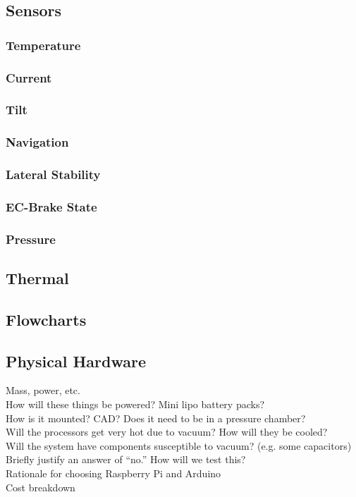 \documentclass[main.tex]{subfiles}
\begin{document}
    \subsection{Sensors}
    \subsubsection{Temperature}
    \subsubsection{Current}
    \subsubsection{Tilt}
    \subsubsection{Navigation}
    \subsubsection{Lateral Stability}
    \subsubsection{EC-Brake State}
    \subsubsection{Pressure}

    \subsection{Thermal}
    \subsection{Flowcharts}

    \subsection{Physical Hardware}
    Mass, power, etc.\\
    How will these things be powered? Mini lipo battery packs?\\
    How is it mounted? CAD? Does it need to be in a pressure chamber?\\
    Will the processors get very hot due to vacuum? How will they be cooled?\\
    Will the system have components susceptible to vacuum? (e.g. some capacitors) Briefly justify an answer of “no.” How will we test this?\\
    Rationale for choosing Raspberry Pi and Arduino\\
    Cost breakdown
\end{document}
